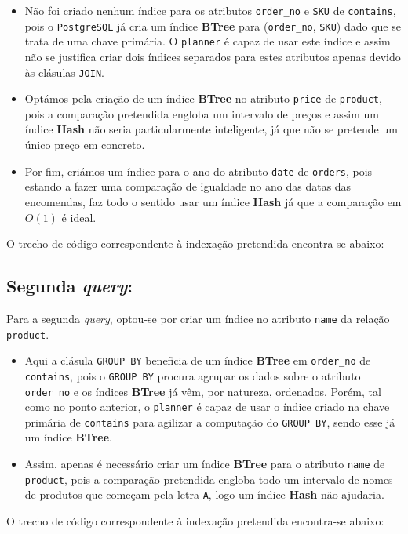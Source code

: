 \documentclass[12pt,a4paper]{article}
\begin{document}
\begin{itemize}
  \item Não foi criado nenhum índice para os atributos \texttt{order\_no} e \texttt{SKU} de \texttt{contains}, pois o
        \texttt{PostgreSQL} já cria um índice \textbf{BTree} para (\texttt{order\_no}, \texttt{SKU}) dado que se trata
        de uma chave primária.
        O \texttt{planner} é capaz de usar este índice e assim não se justifica criar dois
        índices separados para estes atributos apenas devido às clásulas \texttt{JOIN}.

  \item Optámos pela criação de um índice \textbf{BTree} no atributo \texttt{price} de \texttt{product}, pois
        a comparação pretendida engloba um intervalo de preços e assim um índice \textbf{Hash}
        não seria particularmente inteligente, já que não se pretende um único preço
        em concreto.

  \item Por fim, criámos um índice para o ano do atributo \texttt{date} de \texttt{orders}, pois
        estando a fazer uma comparação de igualdade no ano das datas das encomendas,
        faz todo o sentido usar um índice \textbf{Hash} já que a comparação em $O(1)$ é ideal.
\end{itemize}

O trecho de código correspondente à indexação pretendida encontra-se abaixo:



\subsection*{Segunda \textit{query}:}



Para a segunda \textit{query}, optou-se por criar um índice no atributo \texttt{name} da relação
\texttt{product}.

\vspace*{0.25cm}

\begin{itemize}
  \item Aqui a clásula \texttt{GROUP BY} beneficia de um índice \textbf{BTree} em \texttt{order\_no} de
        \texttt{contains}, pois o \texttt{GROUP BY} procura agrupar os dados sobre o atributo \texttt{order\_no}
        e os índices \textbf{BTree} já vêm, por natureza, ordenados.
        Porém, tal como no ponto anterior, o \texttt{planner} é capaz de usar o índice criado
        na chave primária de \texttt{contains} para agilizar a computação do \texttt{GROUP BY}, sendo
        esse já um índice \textbf{BTree}.

  \item Assim, apenas é necessário criar um índice \textbf{BTree} para o atributo \texttt{name}
        de \texttt{product}, pois a comparação pretendida engloba todo um intervalo de nomes
        de produtos que começam pela letra \texttt{A}, logo um índice \textbf{Hash} não ajudaria.
\end{itemize}

O trecho de código correspondente à indexação pretendida encontra-se abaixo:


\end{document}
